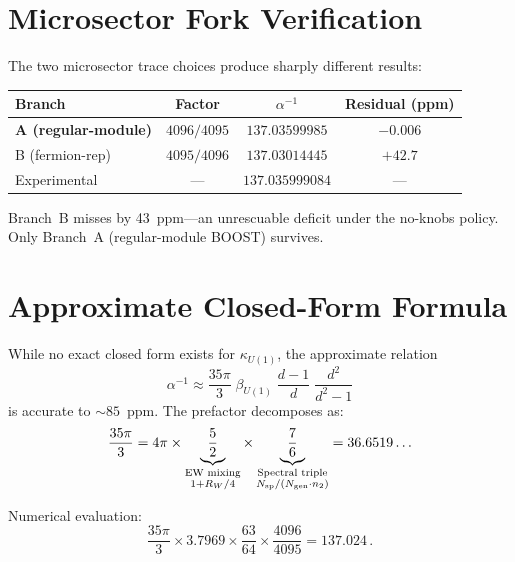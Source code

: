 \documentclass[12pt,a4paper]{article}
\begin{document}
\section{Microsector Fork Verification}

The two microsector trace choices produce sharply different results:

\begin{center}
\renewcommand{\arraystretch}{1.3}
\begin{tabular}{lccc}
\toprule
Branch & Factor & $\alpha^{-1}$ & Residual (ppm) \\
\midrule
\textbf{A (regular-module)} & $4096/4095$ & $137.03599985$ & $-0.006$ \\
B (fermion-rep) & $4095/4096$ & $137.03014445$ & $+42.7$ \\
\midrule
Experimental & --- & $137.035999084$ & --- \\
\bottomrule
\end{tabular}
\end{center}

Branch~B misses by 43~ppm---an unrescuable deficit under the no-knobs
policy.  Only Branch~A (regular-module BOOST) survives.

\section{Approximate Closed-Form Formula}

While no exact closed form exists for $\kappa_{U(1)}$, the approximate
relation
\begin{equation}
\alpha^{-1} \approx \frac{35\pi}{3}\;\beta_{U(1)}\;\frac{d{-}1}{d}\;
\frac{d^2}{d^2{-}1}
\end{equation}
is accurate to $\sim 85$~ppm.  The prefactor decomposes as:
\begin{equation}
\frac{35\pi}{3} = 4\pi \times \underbrace{\frac{5}{2}}_{\substack{\text{EW mixing}\\
1 + R_W/4}} \times \underbrace{\frac{7}{6}}_{\substack{\text{Spectral triple}\\
N_{\rm sp}/(N_{\rm gen} \cdot n_2)}}
= 36.6519\ldots
\end{equation}

Numerical evaluation:
\begin{equation}
\frac{35\pi}{3} \times 3.7969 \times \frac{63}{64} \times \frac{4096}{4095}
= 137.024\,.
\end{equation}
\end{document}
